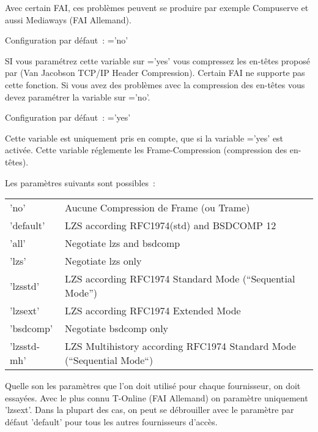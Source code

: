 \begin{description}
  Avec certain FAI, ces problèmes peuvent se produire par exemple Compuserve et
  aussi Mediaways (FAI Allemand).

  Configuration par défaut~: ='no'


  SI vous paramétrez cette variable sur ='yes'
  vous compressez les en-têtes proposé par (Van Jacobson TCP/IP Header Compression).
  Certain FAI ne supporte pas cette fonction. Si vous avez des problèmes avec la
  compression des en-têtes vous devez paramétrer la variable sur
  ='no'.

  Configuration par défaut~: ='yes'


  Cette variable est uniquement pris en compte, que si la variable
  ='yes' est activée. Cette variable réglemente
  les Frame-Com\-pres\-sion (compression des en-têtes).

  Les paramètres suivants sont possibles~:

  \begin{tabular}[h!]{ll}
        'no' &                    Aucune Compression de Frame (ou Trame)\\
        'default' &               LZS according RFC1974(std) and
        BSDCOMP 12 \\
        'all' &                   Negotiate lzs and bsdcomp \\
        'lzs' &                   Negotiate lzs only \\
        'lzsstd' &                LZS according RFC1974 Standard Mode
                                (``Sequential Mode'') \\
        'lzsext' &                LZS according RFC1974 Extended Mode \\
        'bsdcomp' &               Negotiate bsdcomp only \\
        'lzsstd-mh' &             LZS Multihistory according RFC1974
                                  Standard Mode (``Sequential Mode``)
  \end{tabular}

  Quelle son les paramètres que l'on doit utilisé pour chaque fournisseur, on doit
  essayées. Avec le plus connu T-Online (FAI Allemand) on paramètre uniquement 'lzsext'.
  Dans la plupart des cas, on peut se débrouiller avec le paramètre par défaut
  'default' pour tous les autres fournisseurs d'accès.


\end{description}
